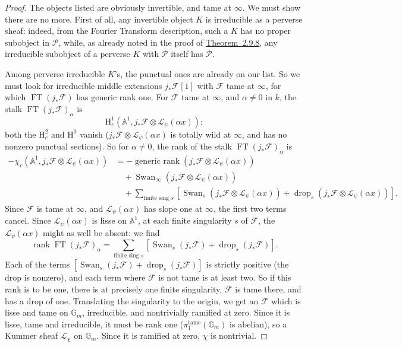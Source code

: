 \begin{proof}
The objects listed are obviously invertible, and tame at \(\infty\). We must
show there are no more. First of all, any invertible object \(K\) is irreducible
as a perverse sheaf: indeed, from the Fourier Transform description, such a
\(K\) has no proper subobject in \(\mathcal{P}\), while, as already noted in
the proof of \hyperref[thm:2.9.8]{Theorem~2.9.8}, any irreducible subobject of
a perverse \(K\) with \(\mathcal{P}\) itself has \(\mathcal{P}\).

Among perverse irreducible \(K\)'s, the punctual ones are already on our list.
So we must look for irreducible middle extensions \(j_*\mathcal{F}[1]\) with
\(\mathcal{F}\) tame at \(\infty\), for which
\(\operatorname{FT}(j_*\mathcal{F})\) has generic rank one. For
\(\mathcal{F}\) tame at \(\infty\), and \(\alpha\neq 0\) in \(k\), the stalk
\(\operatorname{FT}(j_*\mathcal{F})_\alpha\) is
\[
  \mathrm{H}^1_c(\mathbb{A}^1,j_*\mathcal{F}\otimes\mathcal{L}_\psi(\alpha x));
\]
both the \(\mathrm{H}^2_c\) and \(\mathrm{H}^0\) vanish
(\(j_*\mathcal{F}\otimes\mathcal{L}_\psi(\alpha x)\) is totally wild at
\(\infty\), and has no nonzero punctual sections). So for \(\alpha\neq 0\), the
rank of the stalk \(\operatorname{FT}(j_*\mathcal{F})_\alpha\) is
\[
  \begin{aligned}
  -\chi_c(\mathbb{A}^1,j_*\mathcal{F}\otimes\mathcal{L}_\psi(\alpha x))
    &=
  -\operatorname{generic\ rank}(j_*\mathcal{F}\otimes\mathcal{L}_\psi(\alpha x))\\
  &\quad+\operatorname{Swan}_\infty(j_*\mathcal{F}\otimes\mathcal{L}_\psi(\alpha x))\\
  &\quad+\sum_{\text{finite sing }s}
    [\operatorname{Swan}_s(j_*\mathcal{F}\otimes\mathcal{L}_\psi(\alpha x))
      +\operatorname{drop}_s(j_*\mathcal{F}\otimes\mathcal{L}_\psi(\alpha x))].
  \end{aligned}
\]
Since \(\mathcal{F}\) is tame at \(\infty\), and
\(\mathcal{L}_\psi(\alpha x)\) has slope one at \(\infty\), the first two terms
cancel. Since \(\mathcal{L}_\psi(\alpha x)\) is lisse on \(\mathbb{A}^1\), at
each finite singularity \(s\) of \(\mathcal{F}\), the
\(\mathcal{L}_\psi(\alpha x)\) might as well be absent: we find
\[
  \operatorname{rank}\operatorname{FT}(j_*\mathcal{F})_\alpha
  =
  \sum_{\text{finite sing }s}
  [\operatorname{Swan}_s(j_*\mathcal{F})+\operatorname{drop}_s(j_*\mathcal{F})].
\]
Each of the terms
\([\operatorname{Swan}_s(j_*\mathcal{F})+\operatorname{drop}_s(j_*\mathcal{F})]\)
is strictly positive (the drop is nonzero), and each term where \(\mathcal{F}\)
is not tame is at least two. So if this rank is to be one, there is at
precisely one finite singularity, \(\mathcal{F}\) is tame there, and has a drop
of one. Translating the singularity to the origin, we get an \(\mathcal{F}\)
which is lisse and tame on \(\mathbb{G}_m\), irreducible, and nontrivially
ramified at zero. Since it is lisse, tame and irreducible, it must be rank one
(\(\pi_1^{\mathrm{tame}}(\mathbb{G}_m)\) is abelian), so a Kummer sheaf
\(\mathcal{L}_\chi\) on \(\mathbb{G}_m\). Since it is ramified at zero,
\(\chi\) is nontrivial.
\end{proof}

